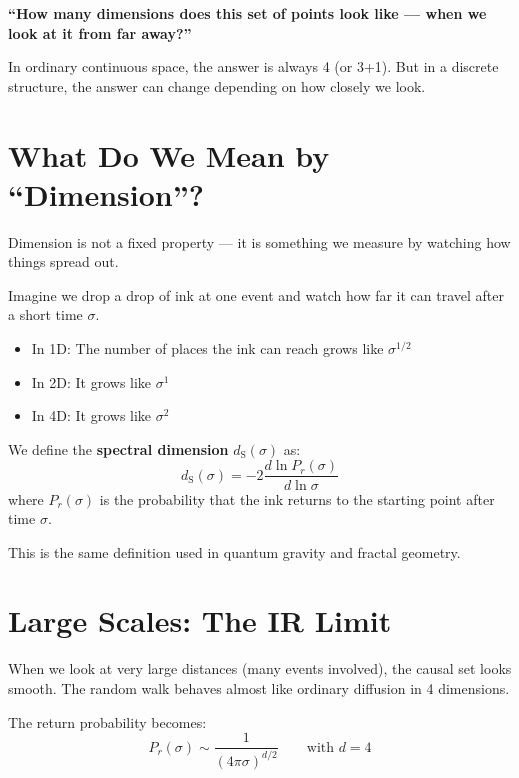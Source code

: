 \documentclass[11pt, a4paper, openany]{book}
\newcommand{\dS}{d_{\mathrm{S}}}
\begin{document}
\textbf{``How many dimensions does this set of points look like --- when we look at it from far away?''}

In ordinary continuous space, the answer is always 4 (or 3+1).
But in a discrete structure, the answer can change depending on how closely we look.

\section{What Do We Mean by ``Dimension''?}

Dimension is not a fixed property --- it is something we measure by watching how things spread out.

Imagine we drop a drop of ink at one event and watch how far it can travel after a short time $\sigma$.

\begin{itemize}
  \item In 1D: The number of places the ink can reach grows like $\sigma^{1/2}$
  \item In 2D: It grows like $\sigma^{1}$
  \item In 4D: It grows like $\sigma^{2}$
\end{itemize}

\begin{definition}
We define the \textbf{spectral dimension} $\dS(\sigma)$ as:
\begin{equation}
\dS(\sigma) = -2 \frac{d \ln P_r(\sigma)}{d \ln \sigma}
\end{equation}
where $P_r(\sigma)$ is the probability that the ink returns to the starting point after time $\sigma$.
\end{definition}

This is the same definition used in quantum gravity and fractal geometry.

\section{Large Scales: The IR Limit}

When we look at very large distances (many events involved), the causal set looks smooth.
The random walk behaves almost like ordinary diffusion in 4 dimensions.

The return probability becomes:
\begin{equation}
P_r(\sigma) \sim \frac{1}{(4\pi \sigma)^{d/2}} \qquad \text{with } d = 4
\end{equation}
\end{document}
